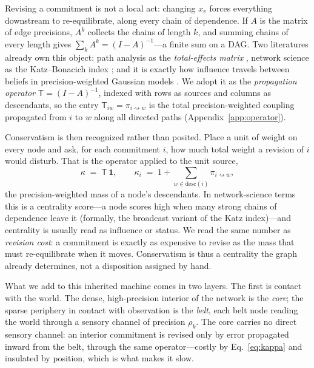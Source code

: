 \documentclass[runningheads]{llncs}
\newcommand{\desc}{\mathrm{desc}}
\newcommand{\rw}{\rightsquigarrow}
\newcommand{\Top}{\mathsf{T}}          %
\newcommand{\bone}{\mathbf{1}}         %
\begin{document}
Revising a commitment is not a local act: changing $x_v$ forces everything downstream to
re-equilibrate, along every chain of dependence. If $A$ is the matrix of edge precisions, $A^k$
collects the chains of length $k$, and summing chains of every length gives
$\sum_k A^k=(I-A)^{-1}$---a finite sum on a DAG. Two literatures already own this object: path
analysis as the \emph{total-effects matrix} \citep{wright1934,bollen1987}, network science as the
Katz--Bonacich index \citep{katz1953,bonacich1987}; and it is exactly how influence travels
between beliefs in precision-weighted Gaussian models \citep{malioutov2006}. We adopt it as the
\emph{propagation operator} $\Top=(I-A)^{-1}$, indexed with rows as sources and columns as
descendants, so the entry $\Top_{iw}=\pi_{i\rw w}$ is the total precision-weighted coupling
propagated from $i$ to $w$ along all directed paths (Appendix~\ref{app:operator}).

Conservatism is then recognized rather than posited. Place a unit of weight on every node and ask,
for each commitment $i$, how much total weight a revision of $i$ would disturb. That is the operator
applied to the unit source,
\begin{equation}
\kappa \;=\; \Top\,\bone,
\qquad
\kappa_i \;=\;1+\!\!\sum_{w\in\desc(i)}\!\!\pi_{i\rw w},
\label{eq:kappa}
\end{equation}
the precision-weighted mass of a node's descendants. In network-science terms this is a centrality
score---a node scores high when many strong chains of dependence leave it (formally, the broadcast
variant of the Katz index)---and centrality is usually read as influence or status. We read the same
number as \emph{revision cost}: a commitment is exactly as expensive to revise as the mass that must
re-equilibrate when it moves. Conservatism is thus a centrality the graph already determines, not a
disposition assigned by hand.

What we add to this inherited machine comes in two layers. The first is contact with the world. The
dense, high-precision interior of the network is the \emph{core}; the sparse periphery in contact
with observation is the \emph{belt}, each belt node reading the world through a sensory channel of
precision $\rho_k$. The core carries no direct sensory channel: an interior commitment is revised
only by error propagated inward from the belt, through the same operator---costly by
Eq.~\eqref{eq:kappa} and insulated by position, which is what makes it slow.
\end{document}
